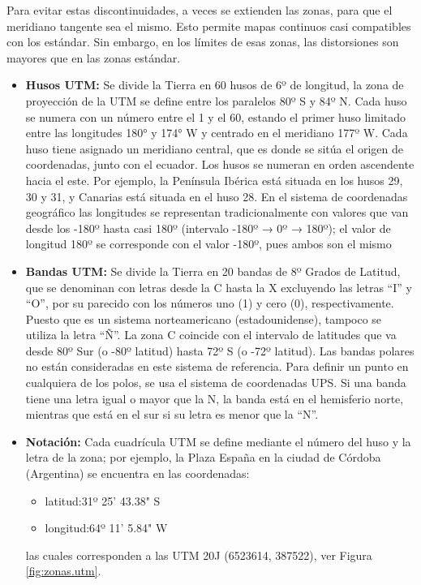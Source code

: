 Para evitar estas discontinuidades, a veces se extienden las zonas, para que el meridiano tangente sea el mismo. Esto permite mapas continuos casi compatibles con los estándar. Sin embargo, en los límites de esas zonas, las distorsiones son mayores que en las zonas estándar.

\begin{itemize}
	\item \textbf{  Husos UTM:}  Se divide la Tierra en 60 husos de 6º de longitud, la zona de
  proyección de la UTM se define entre los paralelos 80º S y 84º
  N. Cada huso se numera con un número entre el 1 y el 60, estando el
  primer huso limitado entre las longitudes 180° y 174° W y centrado
  en el meridiano 177º W. Cada huso tiene asignado un meridiano
  central, que es donde se sitúa el origen de coordenadas, junto con
  el ecuador. Los husos se numeran en orden ascendente hacia el
  este. Por ejemplo, la Península Ibérica está situada en los husos
  29, 30 y 31, y Canarias está situada en el huso 28. En el sistema de
  coordenadas geográfico las longitudes se representan
  tradicionalmente con valores que van desde los -180º hasta casi 180º
  (intervalo -180º → 0º → 180º); el valor de longitud 180º se
  corresponde con el valor -180º, pues ambos son el mismo

\item \textbf{Bandas UTM:}  Se divide la Tierra en 20 bandas de 8º Grados de Latitud, que se
  denominan con letras desde la C hasta la X excluyendo las letras ``I''
  y ``O'', por su parecido con los números uno (1) y cero (0),
  respectivamente. Puesto que es un sistema norteamericano
  (estadounidense), tampoco se utiliza la letra ``\~N''. La zona C
  coincide con el intervalo de latitudes que va desde 80º Sur (o -80º
  latitud) hasta 72º S (o -72º latitud). Las bandas polares no están
  consideradas en este sistema de referencia. Para definir un punto en
  cualquiera de los polos, se usa el sistema de coordenadas UPS. Si
  una banda tiene una letra igual o mayor que la N, la banda está en
  el hemisferio norte, mientras que está en el sur si su letra es
  menor que la ``N''.  

\item \textbf{Notación:} Cada cuadrícula UTM se define mediante el número del huso y la letra
  de la zona; por ejemplo, la Plaza España en la ciudad de C\'ordoba (Argentina) se encuentra en las coordenadas:
  \begin{itemize}
  \item latitud:31º 25' 43.38"  S
  \item longitud:64º 11' 5.84"  W
  \end{itemize}
  las cuales corresponden a las UTM 20J (6523614, 387522), ver Figura \ref{fig:zonas.utm}.  


\end{itemize}
